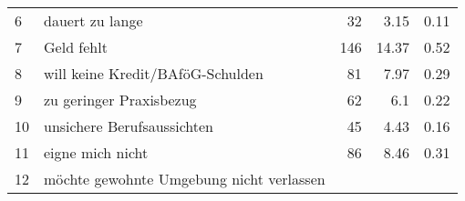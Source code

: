 \begin{longtable}{lXrrr}
     6 &
     \multicolumn{1}{X}{ dauert zu lange   } &


       \num{32} &
       \num[round-mode=places,round-precision=2]{3.15} &
         \num[round-mode=places,round-precision=2]{0.11} \\

     7 &
     \multicolumn{1}{X}{ Geld fehlt   } &


       \num{146} &
       \num[round-mode=places,round-precision=2]{14.37} &
         \num[round-mode=places,round-precision=2]{0.52} \\

     8 &
     \multicolumn{1}{X}{ will keine Kredit/BAföG-Schulden   } &


       \num{81} &
       \num[round-mode=places,round-precision=2]{7.97} &
         \num[round-mode=places,round-precision=2]{0.29} \\

     9 &
     \multicolumn{1}{X}{ zu geringer Praxisbezug   } &


       \num{62} &
       \num[round-mode=places,round-precision=2]{6.1} &
         \num[round-mode=places,round-precision=2]{0.22} \\

     10 &
     \multicolumn{1}{X}{ unsichere Berufsaussichten   } &


       \num{45} &
       \num[round-mode=places,round-precision=2]{4.43} &
         \num[round-mode=places,round-precision=2]{0.16} \\

     11 &
     \multicolumn{1}{X}{ eigne mich nicht   } &


       \num{86} &
       \num[round-mode=places,round-precision=2]{8.46} &
         \num[round-mode=places,round-precision=2]{0.31} \\

     12 &
     \multicolumn{1}{X}{ möchte gewohnte Umgebung nicht verlassen   } &



\end{longtable}
